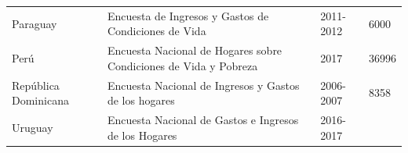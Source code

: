 \begin{longtable}[]{@{}llll@{}}
\begin{minipage}[t]{0.17\columnwidth}
Paraguay\strut
\end{minipage} & \begin{minipage}[t]{0.50\columnwidth}\raggedright
Encuesta de Ingresos y Gastos de Condiciones de Vida\strut
\end{minipage} & \begin{minipage}[t]{0.08\columnwidth}\raggedright
2011-2012\strut
\end{minipage} & \begin{minipage}[t]{0.14\columnwidth}\raggedright
6000\strut
\end{minipage}\tabularnewline
\begin{minipage}[t]{0.17\columnwidth}\raggedright
Perú\strut
\end{minipage} & \begin{minipage}[t]{0.50\columnwidth}\raggedright
Encuesta Nacional de Hogares sobre Condiciones de Vida y Pobreza\strut
\end{minipage} & \begin{minipage}[t]{0.08\columnwidth}\raggedright
2017\strut
\end{minipage} & \begin{minipage}[t]{0.14\columnwidth}\raggedright
36996\strut
\end{minipage}\tabularnewline
\begin{minipage}[t]{0.17\columnwidth}\raggedright
República Dominicana\strut
\end{minipage} & \begin{minipage}[t]{0.50\columnwidth}\raggedright
Encuesta Nacional de Ingresos y Gastos de los hogares\strut
\end{minipage} & \begin{minipage}[t]{0.08\columnwidth}\raggedright
2006-2007\strut
\end{minipage} & \begin{minipage}[t]{0.14\columnwidth}\raggedright
8358\strut
\end{minipage}\tabularnewline
\begin{minipage}[t]{0.17\columnwidth}\raggedright
Uruguay\strut
\end{minipage} & \begin{minipage}[t]{0.50\columnwidth}\raggedright
Encuesta Nacional de Gastos e Ingresos de los Hogares\strut
\end{minipage} & \begin{minipage}[t]{0.08\columnwidth}\raggedright
2016-2017\strut
\end{minipage} & \begin{minipage}[t]{0.14\columnwidth}\raggedright

\end{minipage}
\end{longtable}
